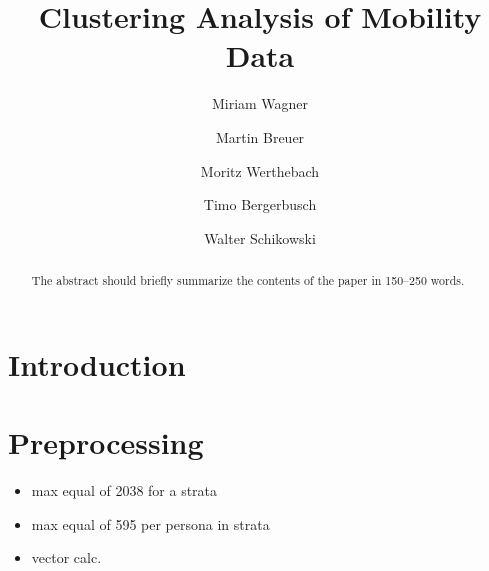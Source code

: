 \documentclass[runningheads]{llncs}
\begin{document}
	\title{Clustering Analysis of Mobility Data}
	\author{Miriam Wagner\and
		Martin Breuer\and
		Moritz Werthebach\and
		Timo Bergerbusch\and
		Walter Schikowski}
	\maketitle              %
	\begin{abstract} %
		The abstract should briefly summarize the contents of the paper in
		150--250 words.
		
	\end{abstract}
	\section{Introduction}
	\section{Preprocessing}
	\begin{itemize}
		\item max equal of 2038 for a strata 
		\item max equal of 595 per persona in strata
		\item vector calc.
	\end{itemize}
\end{document}
